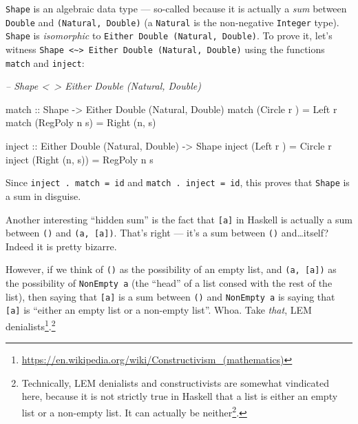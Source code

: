 \documentclass[]{article}
\newenvironment{Shaded}{}{}
\newcommand{\CommentTok}[1]{\textcolor[rgb]{0.38,0.63,0.69}{\textit{#1}}}
\newcommand{\DataTypeTok}[1]{\textcolor[rgb]{0.56,0.13,0.00}{#1}}
\newcommand{\FunctionTok}[1]{\textcolor[rgb]{0.02,0.16,0.49}{#1}}
\newcommand{\NormalTok}[1]{#1}
\newcommand{\OtherTok}[1]{\textcolor[rgb]{0.00,0.44,0.13}{#1}}
\renewcommand{\href}[2]{#2\footnote{\url{#1}}}
\begin{document}
\texttt{Shape} is an algebraic data type --- so-called because it is actually a
\emph{sum} between \texttt{Double} and \texttt{(Natural,\ Double)} (a
\texttt{Natural} is the non-negative \texttt{Integer} type). \texttt{Shape} is
\emph{isomorphic} to \texttt{Either\ Double\ (Natural,\ Double)}. To prove it,
let's witness
\texttt{Shape\ \textless{}\textasciitilde{}\textgreater{}\ Either\ Double\ (Natural,\ Double)}
using the functions \texttt{match} and \texttt{inject}:

\begin{Shaded}
\begin{Highlighting}[]
\CommentTok{-- Shape <~> Either Double (Natural, Double)}

\OtherTok{match ::} \DataTypeTok{Shape} \OtherTok{->} \DataTypeTok{Either} \DataTypeTok{Double}\NormalTok{ (}\DataTypeTok{Natural}\NormalTok{, }\DataTypeTok{Double}\NormalTok{)}
\NormalTok{match (}\DataTypeTok{Circle}\NormalTok{  r  ) }\FunctionTok{=} \DataTypeTok{Left}\NormalTok{ r}
\NormalTok{match (}\DataTypeTok{RegPoly}\NormalTok{ n s) }\FunctionTok{=} \DataTypeTok{Right}\NormalTok{ (n, s)}

\OtherTok{inject ::} \DataTypeTok{Either} \DataTypeTok{Double}\NormalTok{ (}\DataTypeTok{Natural}\NormalTok{, }\DataTypeTok{Double}\NormalTok{) }\OtherTok{->} \DataTypeTok{Shape}
\NormalTok{inject (}\DataTypeTok{Left}\NormalTok{   r    ) }\FunctionTok{=} \DataTypeTok{Circle}\NormalTok{  r}
\NormalTok{inject (}\DataTypeTok{Right}\NormalTok{ (n, s)) }\FunctionTok{=} \DataTypeTok{RegPoly}\NormalTok{ n s}
\end{Highlighting}
\end{Shaded}

Since \texttt{inject\ .\ match\ =\ id} and \texttt{match\ .\ inject\ =\ id},
this proves that \texttt{Shape} is a sum in disguise.

Another interesting ``hidden sum'' is the fact that \texttt{{[}a{]}} in Haskell
is actually a sum between \texttt{()} and \texttt{(a,\ {[}a{]})}. That's right
--- it's a sum between \texttt{()} and\ldots{}itself? Indeed it is pretty
bizarre.

However, if we think of \texttt{()} as the possibility of an empty list, and
\texttt{(a,\ {[}a{]})} as the possibility of \texttt{NonEmpty\ a} (the ``head''
of a list consed with the rest of the list), then saying that \texttt{{[}a{]}}
is a sum between \texttt{()} and \texttt{NonEmpty\ a} is saying that
\texttt{{[}a{]}} is ``either an empty list or a non-empty list''. Whoa. Take
\emph{that},
\href{https://en.wikipedia.org/wiki/Constructivism_(mathematics)}{LEM
denialists}.\footnote{Technically, LEM denialists and constructivists are
  somewhat vindicated here, because it is not strictly true in Haskell that a
  list is either an empty list or a non-empty list. It can actually
  \href{https://wiki.haskell.org/Bottom}{be neither}.}
\end{document}

